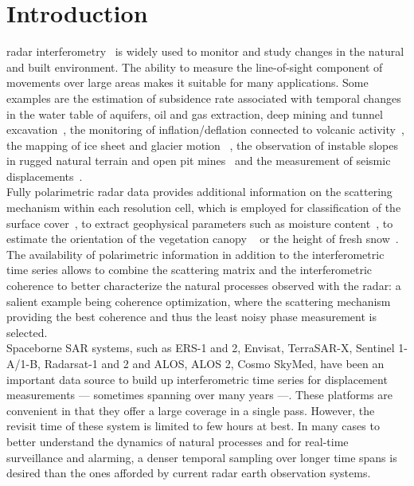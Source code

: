\section{Introduction}
 radar interferometry~\cite{Gabriel1989, Massonnet1993,Rosen2000,Bamler1999} is widely used  to monitor and study changes in the natural and built environment. The ability to  measure the line-of-sight component  of movements over large areas makes it suitable for many  applications. Some examples are the estimation of subsidence rate associated with temporal changes in the water table of aquifers, oil and gas extraction, deep mining and tunnel excavation~\cite{Galloway1998, Strozzi2001,Galloway2007}, the monitoring of inflation/deflation connected to volcanic activity~\cite{Massonnet1995}, the mapping of ice sheet and glacier motion~\cite{Goldstein1993,Mohr1998} , the observation of  instable slopes in rugged natural terrain and open pit mines~\cite{Carnec1996,Catani2005} and the measurement of seismic displacements~\cite{Massonnet1993a,Zebker1994}.\\
Fully polarimetric radar data provides additional information on the scattering mechanism within each resolution cell, which is employed for classification of the surface cover~\cite{Cloude1997, Lee1999}, to extract geophysical parameters such as moisture content~\cite{Hajnsek2003}, to estimate the orientation of the vegetation canopy ~\cite{Ulaby1987} or the height of fresh snow~\cite{Leinss2014}.\\
The availability of polarimetric information in addition to the interferometric time series allows to combine the scattering matrix and the interferometric coherence to better characterize the natural processes observed with the radar: a salient example being coherence optimization, where the scattering mechanism providing the best coherence and thus the least noisy phase measurement is selected\cite{Pipia2009a, Iglesias2014b}.\\
Spaceborne SAR systems, such as ERS-1 and 2, Envisat, TerraSAR-X, Sentinel 1-A/1-B, Radarsat-1 and 2 and ALOS, ALOS 2, Cosmo SkyMed, have been an important data source to build up interferometric time series for displacement measurements --- sometimes spanning over many years ---. These platforms are convenient in that they offer a large coverage in a single pass. However, the revisit time of these system is limited to few hours at best. 
In many cases to better understand the dynamics of natural processes and for real-time surveillance and alarming, a denser temporal sampling over longer time spans is desired than the ones afforded by current radar earth observation systems.
